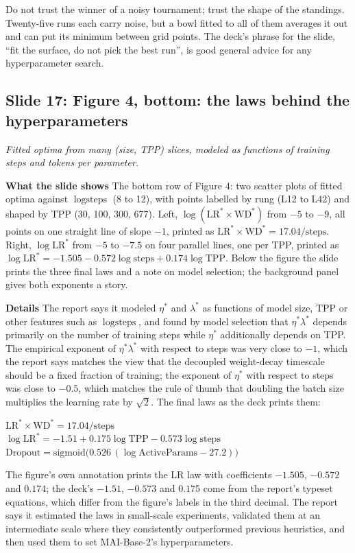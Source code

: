 \documentclass[11pt,letterpaper]{article}
\newcommand{\slide}[3]{%
  \subsection[Slide #1: #2]{Slide #1: #2}%
  {\color{muted}\itshape #3\par}\medskip}
\newcommand{\para}[1]{\medskip\noindent\textbf{#1}\quad}
\newenvironment{intuition}{\begin{tcolorbox}[intuitionbox]}{\end{tcolorbox}}
\newenvironment{formulas}{\begin{tcolorbox}[formulabox]}{\end{tcolorbox}}
\begin{document}
\begin{intuition}
Do not trust the winner of a noisy tournament; trust the shape of the standings. Twenty-five runs each carry noise, but a bowl fitted to all of them averages it out and can put its minimum between grid points. The deck's phrase for the slide, ``fit the surface, do not pick the best run'', is good general advice for any hyperparameter search.
\end{intuition}

\slide{17}{Figure 4, bottom: the laws behind the hyperparameters}{Fitted optima from many (size, TPP) slices, modeled as functions of training steps and tokens per parameter.}

\para{What the slide shows} The bottom row of Figure 4: two scatter plots of fitted optima against $\log\text{steps}$ (8 to 12), with points labelled by rung (L12 to L42) and shaped by TPP (30, 100, 300, 677). Left, $\log(\text{LR}^*\times\text{WD}^*)$ from $-5$ to $-9$, all points on one straight line of slope $-1$, printed as $\text{LR}^*\times\text{WD}^*=17.04/\text{steps}$. Right, $\log\text{LR}^*$ from $-5$ to $-7.5$ on four parallel lines, one per TPP, printed as $\log\text{LR}^*=-1.505-0.572\log\text{steps}+0.174\log\text{TPP}$. Below the figure the slide prints the three final laws and a note on model selection; the background panel gives both exponents a story.

\para{Details} The report says it modeled $\eta^*$ and $\lambda^*$ as functions of model size, TPP or other features such as $\log\text{steps}$, and found by model selection that $\eta^*\lambda^*$ depends primarily on the number of training steps while $\eta^*$ additionally depends on TPP. The empirical exponent of $\eta^*\lambda^*$ with respect to steps was very close to $-1$, which the report says matches the view that the decoupled weight-decay timescale should be a fixed fraction of training; the exponent of $\eta^*$ with respect to steps was close to $-0.5$, which matches the rule of thumb that doubling the batch size multiplies the learning rate by $\sqrt2$. The final laws as the deck prints them:
\begin{formulas}
$\text{LR}^*\times\text{WD}^*=17.04/\text{steps}$\\[3pt]
$\log\text{LR}^*=-1.51+0.175\log\text{TPP}-0.573\log\text{steps}$\\[3pt]
$\text{Dropout}=\mathrm{sigmoid}\big(0.526\,(\log\text{ActiveParams}-27.2)\big)$
\end{formulas}
The figure's own annotation prints the LR law with coefficients $-1.505$, $-0.572$ and $0.174$; the deck's $-1.51$, $-0.573$ and $0.175$ come from the report's typeset equations, which differ from the figure's labels in the third decimal. The report says it estimated the laws in small-scale experiments, validated them at an intermediate scale where they consistently outperformed previous heuristics, and then used them to set MAI-Base-2's hyperparameters.
\end{document}
